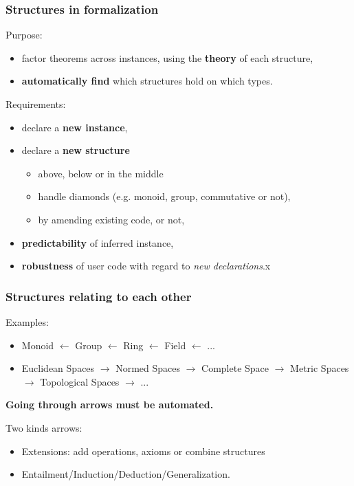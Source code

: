 \documentclass[11pt]{beamer}
\begin{document}
\begin{frame}
  \frametitle{Structures in formalization}

  Purpose:
  \begin{itemize}
  \item factor theorems across instances, using the \textbf{theory} of
    each structure,
  \item \textbf{automatically find} which structures hold on which types.
  \end{itemize}

  \pause
  \vfill

  Requirements:
  \begin{itemize}
  \item declare a \textbf{new instance},
  \pause
  \item declare a \textbf{new structure}
    \begin{itemize}
    \item above, below or in the middle
    \item handle diamonds (e.g. monoid, group, commutative or not),
    \item by amending existing code, or not,
    \end{itemize}
  \pause
  \item \textbf{predictability} of inferred instance,
  \pause
  \item \textbf{robustness} of user code with regard to \textit{new declarations}.x
  \end{itemize}

\end{frame}

\begin{frame}[fragile]
  \frametitle{Structures relating to each other}

  Examples:

  \begin{itemize}
  \item Monoid $\leftarrow$ Group $\leftarrow$ Ring $\leftarrow$ Field
    $\leftarrow$ ...


  \item Euclidean Spaces $\rightarrow$ Normed Spaces $\rightarrow$
    Complete Space $\rightarrow$ Metric Spaces $\rightarrow$ Topological
    Spaces $\rightarrow$ ...

  \end{itemize}

  \pause
  \vfill{}
  
  \textbf{Going through arrows must be automated.}
  
  \pause
  \vfill{}

  Two kinds arrows:
  \begin{itemize}
  \item Extensions: add operations, axioms or combine structures
  \item Entailment/Induction/Deduction/Generalization.
  \end{itemize}

\end{frame}
\end{document}

